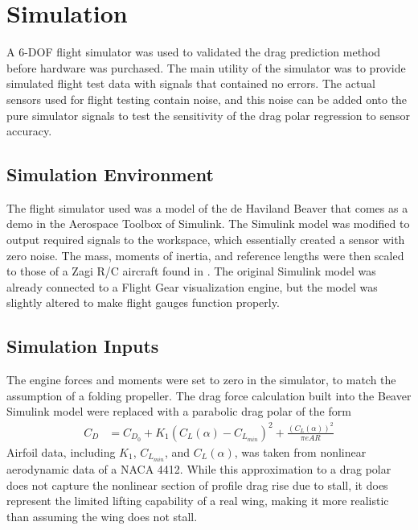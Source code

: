 \chapter{Simulation}
\label{simulation}
A 6-DOF flight simulator was used to validated the drag prediction method before hardware was purchased. The main utility of the simulator was to provide simulated flight test data with signals that contained no errors. The actual sensors used for flight testing contain noise, and this noise can be added onto the pure simulator signals to test the sensitivity of the drag polar regression to sensor accuracy.

\section{Simulation Environment}
The flight simulator used was a model of the de Haviland Beaver that comes as a demo in the Aerospace Toolbox of Simulink. The Simulink model was modified to output required signals to the workspace, which essentially created a sensor with zero noise. The mass, moments of inertia, and reference lengths were then scaled to those of a Zagi R/C aircraft found in \cite{stevens2003aircraft}. The original Simulink model was already connected to a Flight Gear visualization engine, but the model was slightly altered to make flight gauges function properly.

\section{Simulation Inputs}
The engine forces and moments were set to zero in the simulator, to match the assumption of a folding propeller.
The drag force calculation built into the Beaver Simulink model were replaced with a parabolic drag polar of the form
\begin{align}
C_D &= C_{D_0} + K_1(C_L(\alpha)-C_{L_{min}})^2+\frac{(C_L(\alpha))^2}{\pi eAR}
\end{align}
Airfoil data, including $K_1$, $C_{L_{min}}$, and $C_L(\alpha)$, was taken from nonlinear aerodynamic data of a NACA 4412. While this approximation to a drag polar does not capture the nonlinear section of profile drag rise due to stall, it does represent the limited lifting capability of a real wing, making it more realistic than assuming the wing does not stall.
